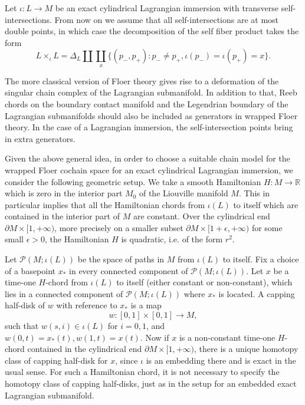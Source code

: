 \documentclass{amsart}
\numberwithin{equation}{section}
\numberwithin{figure}{section}
\begin{document}
	Let $\iota: L \to M$ be an exact cylindrical Lagrangian immersion with transverse self-intersections. From now on we assume that all self-intersections are at most double points, in which case the decomposition of the self fiber product takes the form
\begin{equation} \label{decomposition of the self fiber product of Lagrangian immersion with transverse self-intersections}
L \times_{\iota} L = \Delta_{L} \coprod \coprod_{x} \{(p_{-}, p_{+}): p_{-} \neq p_{+}, \iota(p_{-}) = \iota(p_{+}) = x\}.
\end{equation}
\par
	The more classical version of Floer theory gives rise to a deformation of the singular chain complex of the Lagrangian submanifold. In addition to that, Reeb chords on the boundary contact manifold and the Legendrian boundary of the Lagrangian submanifolds should also be included as generators in wrapped Floer theory. In the case of a Lagrangian immersion, the self-intersection points bring in extra generators. \par
	Given the above general idea, in order to choose a suitable chain model for the wrapped Floer cochain space for an exact cylindrical Lagrangian immersion, we consider the following geometric setup. We take a smooth Hamiltonian $H: M \to \mathbb{R}$ which is zero in the interior part $M_{0}$ of the Liouville manifold $M$. This in particular implies that all the Hamiltonian chords from $\iota(L)$ to itself which are contained in the interior part of $M$ are constant. Over the cylindrical end $\partial M \times [1, +\infty)$, more precisely on a smaller subset $\partial M \times [1 + \epsilon, +\infty)$ for some small $\epsilon > 0$, the Hamiltonian $H$ is quadratic, i.e. of the form $r^{2}$. \par
	Let $\mathcal{P}(M; \iota(L))$ be the space of paths in $M$ from $\iota(L)$ to itself. Fix a choice of a basepoint $x_{*}$ in every connected component of $\mathcal{P}(M; \iota(L))$. Let $x$ be a time-one $H$-chord from $\iota(L)$ to itself (either constant or non-constant), which lies in a connected component of $\mathcal{P}(M; \iota(L))$ where $x_{*}$ is located. A capping half-disk of $w$ with reference to $x_{*}$ is a map
\begin{equation}
w: [0, 1] \times [0, 1] \to M,
\end{equation}
such that $w(s, i) \in \iota(L)$ for $i = 0, 1$, and $w(0, t) = x_{*}(t), w(1, t) = x(t)$. Now if $x$ is a non-constant time-one $H$-chord contained in the cylindrical end $\partial M \times [1, +\infty)$, there is a unique homotopy class of capping half-disk for $x$, since $\iota$ is an embedding there and is exact in the usual sense. For such a Hamiltonian chord, it is not necessary to specify the homotopy class of capping half-disks, just as in the setup for an embedded exact Lagrangian submanifold. \par
\end{document}
